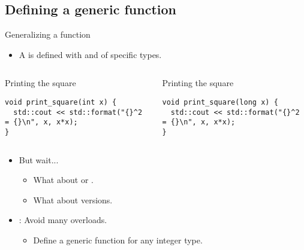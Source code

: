 \subsection{Defining a generic function}

\begin{frame}[t,fragile]{Generalizing a function}
\begin{itemize}
  \item A  is defined with 
         and  of specific types.
\end{itemize}

\begin{columns}[T]

\begin{block}{Printing the square}
\begin{lstlisting}
void print_square(int x) {
  std::cout << std::format("{}^2 = {}\n", x, x*x);
}
\end{lstlisting}
\end{block}

\begin{block}{Printing the square}
\begin{lstlisting}
void print_square(long x) {
  std::cout << std::format("{}^2 = {}\n", x, x*x);
}

\end{lstlisting}
\end{block}

\end{columns}

\begin{itemize}
  \item But wait...
    \begin{itemize}
      \item What about  or .
      \item What about  versions.
    \end{itemize}

  \item {}: Avoid many overloads.
    \begin{itemize}
      \item Define a generic function for any integer type.
    \end{itemize}
\end{itemize}

\end{frame}

